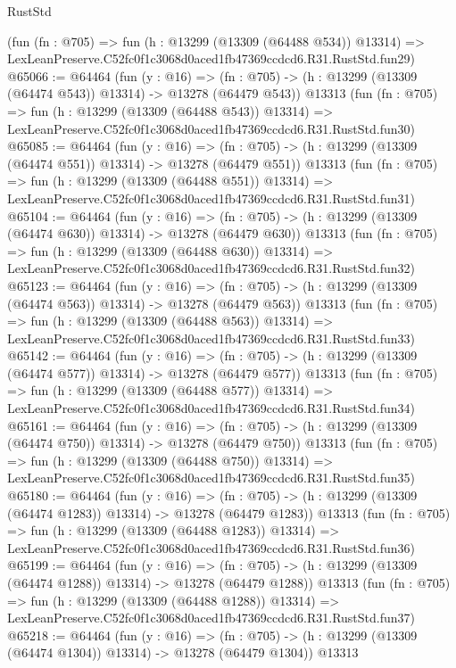 \begin{lexlean}{RustStd}
\begin{coremodule}
    (fun (fn : @705) =>
    fun (h : @13299 (@13309 (@64488 @534)) @13314) =>
    LexLeanPreserve.C52fc0f1c3068d0aced1fb47369ccdcd6.R31.RustStd.fun29)
@65066 := @64464
    (fun (y : @16) =>
    (fn : @705) -> (h : @13299 (@13309 (@64474 @543)) @13314) -> @13278 (@64479 @543))
    @13313
    (fun (fn : @705) =>
    fun (h : @13299 (@13309 (@64488 @543)) @13314) =>
    LexLeanPreserve.C52fc0f1c3068d0aced1fb47369ccdcd6.R31.RustStd.fun30)
@65085 := @64464
    (fun (y : @16) =>
    (fn : @705) -> (h : @13299 (@13309 (@64474 @551)) @13314) -> @13278 (@64479 @551))
    @13313
    (fun (fn : @705) =>
    fun (h : @13299 (@13309 (@64488 @551)) @13314) =>
    LexLeanPreserve.C52fc0f1c3068d0aced1fb47369ccdcd6.R31.RustStd.fun31)
@65104 := @64464
    (fun (y : @16) =>
    (fn : @705) -> (h : @13299 (@13309 (@64474 @630)) @13314) -> @13278 (@64479 @630))
    @13313
    (fun (fn : @705) =>
    fun (h : @13299 (@13309 (@64488 @630)) @13314) =>
    LexLeanPreserve.C52fc0f1c3068d0aced1fb47369ccdcd6.R31.RustStd.fun32)
@65123 := @64464
    (fun (y : @16) =>
    (fn : @705) -> (h : @13299 (@13309 (@64474 @563)) @13314) -> @13278 (@64479 @563))
    @13313
    (fun (fn : @705) =>
    fun (h : @13299 (@13309 (@64488 @563)) @13314) =>
    LexLeanPreserve.C52fc0f1c3068d0aced1fb47369ccdcd6.R31.RustStd.fun33)
@65142 := @64464
    (fun (y : @16) =>
    (fn : @705) -> (h : @13299 (@13309 (@64474 @577)) @13314) -> @13278 (@64479 @577))
    @13313
    (fun (fn : @705) =>
    fun (h : @13299 (@13309 (@64488 @577)) @13314) =>
    LexLeanPreserve.C52fc0f1c3068d0aced1fb47369ccdcd6.R31.RustStd.fun34)
@65161 := @64464
    (fun (y : @16) =>
    (fn : @705) -> (h : @13299 (@13309 (@64474 @750)) @13314) -> @13278 (@64479 @750))
    @13313
    (fun (fn : @705) =>
    fun (h : @13299 (@13309 (@64488 @750)) @13314) =>
    LexLeanPreserve.C52fc0f1c3068d0aced1fb47369ccdcd6.R31.RustStd.fun35)
@65180 := @64464
    (fun (y : @16) =>
    (fn : @705) -> (h : @13299 (@13309 (@64474 @1283)) @13314) -> @13278 (@64479 @1283))
    @13313
    (fun (fn : @705) =>
    fun (h : @13299 (@13309 (@64488 @1283)) @13314) =>
    LexLeanPreserve.C52fc0f1c3068d0aced1fb47369ccdcd6.R31.RustStd.fun36)
@65199 := @64464
    (fun (y : @16) =>
    (fn : @705) -> (h : @13299 (@13309 (@64474 @1288)) @13314) -> @13278 (@64479 @1288))
    @13313
    (fun (fn : @705) =>
    fun (h : @13299 (@13309 (@64488 @1288)) @13314) =>
    LexLeanPreserve.C52fc0f1c3068d0aced1fb47369ccdcd6.R31.RustStd.fun37)
@65218 := @64464
    (fun (y : @16) =>
    (fn : @705) -> (h : @13299 (@13309 (@64474 @1304)) @13314) -> @13278 (@64479 @1304))
    @13313

\end{coremodule}
\end{lexlean}
